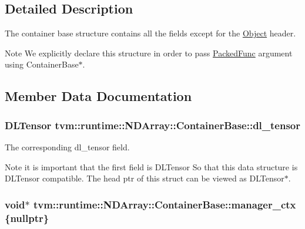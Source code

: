 \subsection{Detailed Description}
The container base structure contains all the fields except for the \hyperlink{classtvm_1_1runtime_1_1Object}{Object} header. 

\begin{DoxyNote}{Note}
We explicitly declare this structure in order to pass \hyperlink{classtvm_1_1runtime_1_1PackedFunc}{Packed\+Func} argument using Container\+Base$\ast$. 
\end{DoxyNote}


\subsection{Member Data Documentation}
\subsubsection[{\texorpdfstring{dl\+\_\+tensor}{dl_tensor}}]{\setlength{\rightskip}{0pt plus 5cm}D\+L\+Tensor tvm\+::runtime\+::\+N\+D\+Array\+::\+Container\+Base\+::dl\+\_\+tensor}\hypertarget{classtvm_1_1runtime_1_1NDArray_1_1ContainerBase_a1063a9d01075d5b7b0e8fa31d4d72e0b}{}\label{classtvm_1_1runtime_1_1NDArray_1_1ContainerBase_a1063a9d01075d5b7b0e8fa31d4d72e0b}


The corresponding dl\+\_\+tensor field. 

\begin{DoxyNote}{Note}
it is important that the first field is D\+L\+Tensor So that this data structure is D\+L\+Tensor compatible. The head ptr of this struct can be viewed as D\+L\+Tensor$\ast$. 
\end{DoxyNote}
\subsubsection[{\texorpdfstring{manager\+\_\+ctx}{manager_ctx}}]{\setlength{\rightskip}{0pt plus 5cm}void$\ast$ tvm\+::runtime\+::\+N\+D\+Array\+::\+Container\+Base\+::manager\+\_\+ctx \{nullptr\}}\hypertarget{classtvm_1_1runtime_1_1NDArray_1_1ContainerBase_a56d07e60df973dcf2b99ef6a204bb184}{}\label{classtvm_1_1runtime_1_1NDArray_1_1ContainerBase_a56d07e60df973dcf2b99ef6a204bb184}


